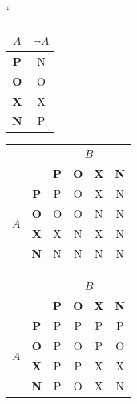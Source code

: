 \documentclass[a4paper, 11pt]{article}
\begin{document}
\bigskip
\catcode`
\begin{table}[h]
    \centering
    
\begin{tabular}{ | c | c | }
    \hline
    $A$ & $\neg A$\\ \hline
    \textbf{P}          & N  \\ \hline
    \textbf{O}          & O  \\ \hline
    \textbf{X}          & X  \\ \hline
    \textbf{N}          & P  \\ \hline
    
\end{tabular}
\begin{tabular}{|c|c|c|c|c|c|}
\hline
\multicolumn{2}{|l|}{         \multirow{2}{*}{$A \wedge B$}} & \multicolumn{4}{c|}{$B$}    \\ \cline{3-6} 
\multicolumn{2}{|l|}{}      & \textbf{P}    & \textbf{O}   & \textbf{X}   & \textbf{N}   \\ \hline
\multirow{4}{*}{$A$}        & \textbf{P}    & P            & O            & X      & N   \\ \cline{2-6} 
                            & \textbf{O}    & O            & O            & N      & N   \\ \cline{2-6} 
                            & \textbf{X}    & X            & N            & X      & N   \\ \cline{2-6} 
                            & \textbf{N}    & N            & N            & N      & N   \\ \hline
\end{tabular}
\begin{tabular}{|c|c|c|c|c|c|}
\hline
\multicolumn{2}{|l|}{         \multirow{2}{*}{$A \vee B$}} & \multicolumn{4}{c|}{$B$}    \\ \cline{3-6} 
\multicolumn{2}{|l|}{}      & \textbf{P}    & \textbf{O}   & \textbf{X}   & \textbf{N}   \\ \hline
\multirow{4}{*}{$A$}        & \textbf{P}    & P            & P            & P      & P   \\ \cline{2-6} 
                            & \textbf{O}    & P            & O            & P      & O   \\ \cline{2-6} 
                            & \textbf{X}    & P            & P            & X      & X   \\ \cline{2-6} 
                            & \textbf{N}    & P            & O            & X      & N   \\ \hline

\end{tabular}
\end{table}
\end{document}
